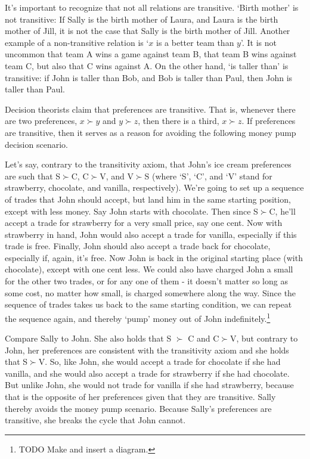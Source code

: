 \documentclass[]{tufte-book}
\begin{document}
It's important to recognize that not all relations are transitive. `Birth mother' is not transitive: If Sally is the birth mother of Laura, and Laura is the birth mother of Jill, it is not the case that Sally is the birth mother of Jill. Another example of a non-transitive relation is `\(x\) is a better team than \(y\)'. It is not uncommon that team A wins a game against team B, that team B wins against team C, but also that C wins against A. On the other hand, `is taller than' is transitive: if John is taller than Bob, and Bob is taller than Paul, then John is taller than Paul.

Decision theorists claim that preferences are transitive. That is, whenever there are two preferences, \(x\succ y\) and \(y\succ z\), then there is a third, \(x\succ z\). If preferences are transitive, then it serves as a reason for avoiding the following money pump decision scenario.

Let's say, contrary to the transitivity axiom, that John's ice cream preferences are such that S\(\succ\)C, C\(\succ\)V, and V\(\succ\)S (where `S', `C', and `V' stand for strawberry, chocolate, and vanilla, respectively). We're going to set up a sequence of trades that John should accept, but land him in the same starting position, except with less money. Say John starts with chocolate. Then since S\(\succ\)C, he'll accept a trade for strawberry for a very small price, say one cent. Now with strawberry in hand, John would also accept a trade for vanilla, especially if this trade is free. Finally, John should also accept a trade back for chocolate, especially if, again, it's free. Now John is back in the original starting place (with chocolate), except with one cent less. We could also have charged John a small for the other two trades, or for any one of them - it doesn't matter so long as some cost, no matter how small, is charged somewhere along the way. Since the sequence of trades takes us back to the same starting condition, we can repeat the sequence again, and thereby `pump' money out of John indefinitely.\footnote{TODO Make and insert a diagram.}

Compare Sally to John. She also holds that S \(\succ\) C and C\(\succ\)V, but contrary to John, her preferences are consistent with the transitivity axiom and she holds that S\(\succ\)V. So, like John, she would accept a trade for chocolate if she had vanilla, and she would also accept a trade for strawberry if she had chocolate. But unlike John, she would not trade for vanilla if she had strawberry, because that is the opposite of her preferences given that they are transitive. Sally thereby avoids the money pump scenario. Because Sally's preferences are transitive, she breaks the cycle that John cannot.
\end{document}
